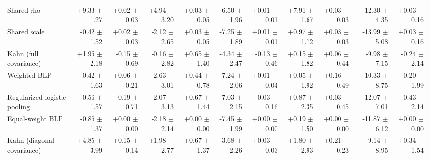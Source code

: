\begin{tabular}{lrrrrrrrrrr}
Shared rho & +9.33 {\scriptsize $\pm$ 1.27} & +0.02 {\scriptsize $\pm$ 0.03} & +4.94 {\scriptsize $\pm$ 3.20} & +0.03 {\scriptsize $\pm$ 0.05} & -6.50 {\scriptsize $\pm$ 1.96} & +0.01 {\scriptsize $\pm$ 0.01} & +7.91 {\scriptsize $\pm$ 1.67} & +0.03 {\scriptsize $\pm$ 0.03} & +12.30 {\scriptsize $\pm$ 4.35} & +0.03 {\scriptsize $\pm$ 0.16} \\
Shared scale & -0.42 {\scriptsize $\pm$ 1.52} & +0.02 {\scriptsize $\pm$ 0.03} & -2.12 {\scriptsize $\pm$ 2.65} & +0.03 {\scriptsize $\pm$ 0.05} & -7.25 {\scriptsize $\pm$ 1.89} & +0.01 {\scriptsize $\pm$ 0.01} & +0.97 {\scriptsize $\pm$ 1.72} & +0.03 {\scriptsize $\pm$ 0.03} & -13.99 {\scriptsize $\pm$ 5.08} & +0.03 {\scriptsize $\pm$ 0.16} \\
Kahn (full covariance) & +1.95 {\scriptsize $\pm$ 2.18} & -0.15 {\scriptsize $\pm$ 0.69} & -0.16 {\scriptsize $\pm$ 2.82} & +0.65 {\scriptsize $\pm$ 1.40} & -4.34 {\scriptsize $\pm$ 2.47} & -0.13 {\scriptsize $\pm$ 0.46} & +0.15 {\scriptsize $\pm$ 1.82} & +0.06 {\scriptsize $\pm$ 0.44} & -9.98 {\scriptsize $\pm$ 7.15} & -0.24 {\scriptsize $\pm$ 2.14} \\
Weighted BLP & -0.42 {\scriptsize $\pm$ 1.63} & +0.06 {\scriptsize $\pm$ 0.21} & -2.63 {\scriptsize $\pm$ 3.01} & +0.44 {\scriptsize $\pm$ 0.78} & -7.24 {\scriptsize $\pm$ 2.06} & +0.01 {\scriptsize $\pm$ 0.04} & +0.05 {\scriptsize $\pm$ 1.92} & +0.16 {\scriptsize $\pm$ 0.49} & -10.33 {\scriptsize $\pm$ 8.75} & -0.20 {\scriptsize $\pm$ 1.99} \\
Regularized logistic pooling & -0.56 {\scriptsize $\pm$ 1.57} & -0.19 {\scriptsize $\pm$ 0.71} & -2.07 {\scriptsize $\pm$ 3.13} & +0.67 {\scriptsize $\pm$ 1.44} & -7.03 {\scriptsize $\pm$ 2.15} & -0.03 {\scriptsize $\pm$ 0.16} & +0.87 {\scriptsize $\pm$ 2.35} & +0.03 {\scriptsize $\pm$ 0.45} & -12.07 {\scriptsize $\pm$ 7.01} & -0.43 {\scriptsize $\pm$ 2.14} \\
Equal-weight BLP & -0.86 {\scriptsize $\pm$ 1.37} & +0.00 {\scriptsize $\pm$ 0.00} & -2.18 {\scriptsize $\pm$ 2.14} & +0.00 {\scriptsize $\pm$ 0.00} & -7.45 {\scriptsize $\pm$ 1.99} & +0.00 {\scriptsize $\pm$ 0.00} & +0.19 {\scriptsize $\pm$ 1.50} & +0.00 {\scriptsize $\pm$ 0.00} & -11.87 {\scriptsize $\pm$ 6.12} & +0.00 {\scriptsize $\pm$ 0.00} \\
Kahn (diagonal covariance) & +4.85 {\scriptsize $\pm$ 3.99} & +0.15 {\scriptsize $\pm$ 0.14} & +1.98 {\scriptsize $\pm$ 2.77} & +0.67 {\scriptsize $\pm$ 1.37} & -3.68 {\scriptsize $\pm$ 2.26} & +0.03 {\scriptsize $\pm$ 0.03} & +1.80 {\scriptsize $\pm$ 2.93} & +0.21 {\scriptsize $\pm$ 0.23} & -9.14 {\scriptsize $\pm$ 8.95} & +0.34 {\scriptsize $\pm$ 1.54} \\

\end{tabular}
